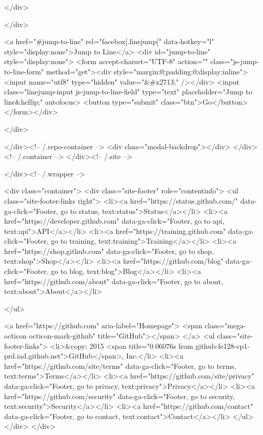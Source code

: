   </div>

</div>

<a href="#jump-to-line" rel="facebox[.linejump]" data-hotkey="l" style="display:none">Jump to Line</a>
<div id="jump-to-line" style="display:none">
  <form accept-charset="UTF-8" action="" class="js-jump-to-line-form" method="get"><div style="margin:0;padding:0;display:inline"><input name="utf8" type="hidden" value="&#x2713;" /></div>
    <input class="linejump-input js-jump-to-line-field" type="text" placeholder="Jump to line&hellip;" autofocus>
    <button type="submit" class="btn">Go</button>
</form></div>

        </div>

      </div><!-- /.repo-container -->
      <div class="modal-backdrop"></div>
    </div><!-- /.container -->
  </div><!-- /.site -->


    </div><!-- /.wrapper -->

      <div class="container">
  <div class="site-footer" role="contentinfo">
    <ul class="site-footer-links right">
        <li><a href="https://status.github.com/" data-ga-click="Footer, go to status, text:status">Status</a></li>
      <li><a href="https://developer.github.com" data-ga-click="Footer, go to api, text:api">API</a></li>
      <li><a href="https://training.github.com" data-ga-click="Footer, go to training, text:training">Training</a></li>
      <li><a href="https://shop.github.com" data-ga-click="Footer, go to shop, text:shop">Shop</a></li>
        <li><a href="https://github.com/blog" data-ga-click="Footer, go to blog, text:blog">Blog</a></li>
        <li><a href="https://github.com/about" data-ga-click="Footer, go to about, text:about">About</a></li>

    </ul>

    <a href="https://github.com" aria-label="Homepage">
      <span class="mega-octicon octicon-mark-github" title="GitHub"></span>
</a>
    <ul class="site-footer-links">
      <li>&copy; 2015 <span title="0.06076s from github-fe128-cp1-prd.iad.github.net">GitHub</span>, Inc.</li>
        <li><a href="https://github.com/site/terms" data-ga-click="Footer, go to terms, text:terms">Terms</a></li>
        <li><a href="https://github.com/site/privacy" data-ga-click="Footer, go to privacy, text:privacy">Privacy</a></li>
        <li><a href="https://github.com/security" data-ga-click="Footer, go to security, text:security">Security</a></li>
        <li><a href="https://github.com/contact" data-ga-click="Footer, go to contact, text:contact">Contact</a></li>
    </ul>
  </div>
</div>


